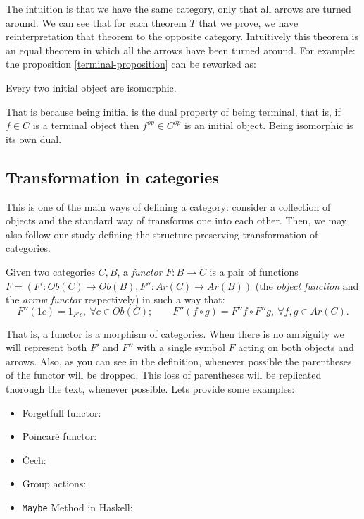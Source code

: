 The intuition is that we have the same category, only that all arrows are turned around. We can see that  for each theorem $T$ that we prove, we have reinterpretation that theorem to the opposite category. Intuitively this theorem is an equal theorem in which all the arrows have been turned around. For example: the proposition
\ref{terminal-proposition} can be reworked as:

\begin{proposition}
  Every two initial object are isomorphic.
\end{proposition}


That is because being initial is the dual property of being terminal, that is, if $f\in C$ is a terminal object then $f^{op}\in C^{op}$ is an initial object. Being isomorphic is its own dual.
\subsection{Transformation in categories}




This is one of the main ways of defining a category: consider a collection of objects and the standard way of transforms one into each other. Then, we may also follow our study defining the structure preserving transformation of categories.

\begin{definition}
  Given two categories $C, B$, a \emph{functor} $F: B \to C$ is a pair of functions $F=(F':Ob(C)\to Ob(B),F'':Ar(C)\to Ar(B))$ (the \emph{object function} and the \emph{arrow functor} respectively) in such a way that:
  $$F''(1c) = 1_{F'c}, \ \forall c \in Ob(C); \qquad F''(f\circ g) = F''f \circ F''g, \ \forall f,g  \in Ar(C).$$

\end{definition}


That is,  a functor is a morphism of categories. When there is no ambiguity we will represent both $F'$ and $F''$ with a single symbol $F$ acting on both objects and arrows. Also, as you can see in the definition, whenever possible the parentheses of the functor will be dropped. This loss of parentheses will be replicated thorough the text, whenever possible. Lets provide some examples:\\

\begin{example}
  \begin{itemize}
  \item Forgetfull functor:
  \item Poincaré functor:
  \item \v{C}ech:
  \item Group actions:
  \item \texttt{Maybe} Method in Haskell:
  \end{itemize}
\end{example}

